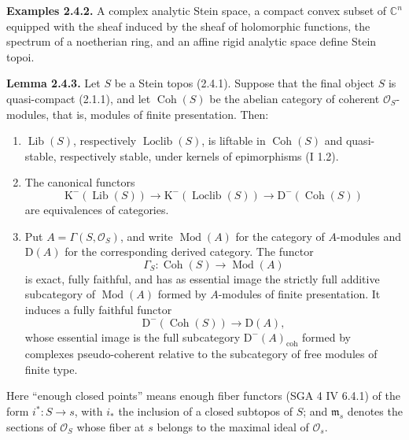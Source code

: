 \documentclass[11pt]{article}
\providecommand{\Mod}{\operatorname{Mod}}
\providecommand{\Lib}{\operatorname{Lib}}
\providecommand{\Loclib}{\operatorname{Loclib}}
\providecommand{\Coh}{\operatorname{Coh}}
\providecommand{\coh}{\operatorname{coh}}
\begin{document}
\textbf{Examples 2.4.2.} A complex analytic Stein space, a compact convex subset of $\mathbb C^n$ equipped with the sheaf induced by the sheaf of holomorphic functions, the spectrum of a noetherian ring, and an affine rigid analytic space define Stein topoi.

\textbf{Lemma 2.4.3.} Let $S$ be a Stein topos (2.4.1). Suppose that the final object $S$ is quasi-compact (2.1.1), and let $\Coh(S)$ be the abelian category of coherent $\mathcal O_S$-modules, that is, modules of finite presentation. Then:
\begin{enumerate}[label=\alph*)]
\item $\Lib(S)$, respectively $\Loclib(S)$, is liftable in $\Coh(S)$ and quasi-stable, respectively stable, under kernels of epimorphisms (I 1.2).
\item The canonical functors
\[
\mathrm K^{-}(\Lib(S))\longrightarrow \mathrm K^{-}(\Loclib(S))\longrightarrow \mathrm D^{-}(\Coh(S))
\]
are equivalences of categories.
\item Put $A=\Gamma(S,\mathcal O_S)$, and write $\Mod(A)$ for the category of $A$-modules and $\mathrm D(A)$ for the corresponding derived category. The functor
\[
\Gamma_S:\Coh(S)\longrightarrow\Mod(A)
\]
is exact, fully faithful, and has as essential image the strictly full additive subcategory of $\Mod(A)$ formed by $A$-modules of finite presentation. It induces a fully faithful functor
\[
\mathrm D^{-}(\Coh(S))\longrightarrow\mathrm D(A),
\]
whose essential image is the full subcategory $\mathrm D^{-}(A)_{\coh}$ formed by complexes pseudo-coherent relative to the subcategory of free modules of finite type.
\end{enumerate}
Here ``enough closed points'' means enough fiber functors (SGA 4 IV 6.4.1) of the form $i^*:S\to s$, with $i_*$ the inclusion of a closed subtopos of $S$; and $\mathfrak m_s$ denotes the sections of $\mathcal O_S$ whose fiber at $s$ belongs to the maximal ideal of $\mathcal O_s$.
\end{document}
